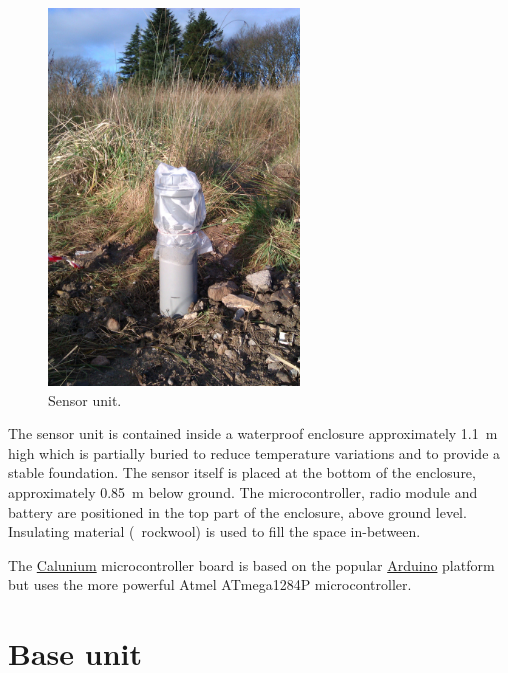 \begin{figure}
  \centering
  \includegraphics[keepaspectratio,height=10cm]{images/sensor-unit}
  \caption[Sensor unit]{%
    Sensor unit. }
  \label{fig:sensor-unit}
\end{figure}

The sensor unit is contained inside a waterproof enclosure
approximately \SI{1.1}{\metre} high which is partially buried to reduce
temperature variations and to provide a stable foundation. The sensor
itself is placed at the bottom of the enclosure, approximately
\SI{0.85}{\metre} below ground. The microcontroller, radio module and
battery are positioned in the top part of the enclosure, above ground
level. Insulating material (\eg\ rockwool) is used to fill the space
in-between.

The
\href{http://blog.stevemarple.co.uk/search/label/Calunium}{Calunium}
microcontroller board is based on the popular
\href{http://arduino.cc}{Arduino} platform but uses the more powerful
Atmel ATmega1284P microcontroller.

\section{Base unit}

